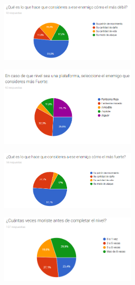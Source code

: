\begin{figure}[H]
    \centering
    \includegraphics[width=0.6\textwidth]{Anexos/respuestas/grafica19.png}
\end{figure}

\begin{figure}[H]
    \centering
    \includegraphics[width=0.6\textwidth]{Anexos/respuestas/grafica20.png}
\end{figure}

\begin{figure}[H]
    \centering
    \includegraphics[width=0.6\textwidth]{Anexos/respuestas/grafica21.png}
\end{figure}

\begin{figure}[H]
    \centering
    \includegraphics[width=0.6\textwidth]{Anexos/respuestas/grafica22.png}
\end{figure}

